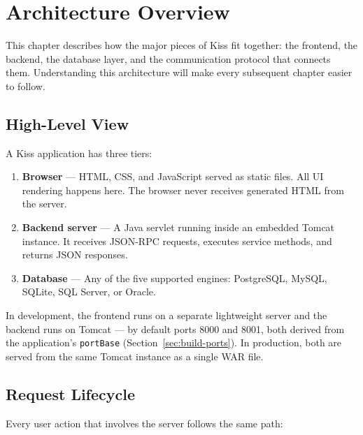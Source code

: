 \chapter{Architecture Overview}
\label{ch:architecture}

This chapter describes how the major pieces of Kiss fit together: the frontend, the backend, the database layer, and the communication protocol that connects them.  Understanding this architecture will make every subsequent chapter easier to follow.

\section{High-Level View}
\label{sec:arch-highlevel}

A Kiss application has three tiers:

\begin{enumerate}
  \item \textbf{Browser} --- HTML, CSS, and JavaScript served as static files.  All UI rendering happens here.  The browser never receives generated HTML from the server.
  \item \textbf{Backend server} --- A Java servlet running inside an embedded Tomcat instance.  It receives JSON-RPC requests, executes service methods, and returns JSON responses.
  \item \textbf{Database} --- Any of the five supported engines: PostgreSQL, MySQL, SQLite, SQL Server, or Oracle.
\end{enumerate}

\begin{notebox}
In development, the frontend runs on a separate lightweight server and the backend runs on Tomcat --- by default ports 8000 and 8001, both derived from the application's \texttt{portBase} (Section~\ref{sec:build-ports}).  In production, both are served from the same Tomcat instance as a single WAR file.
\end{notebox}

\section{Request Lifecycle}
\label{sec:arch-request}

Every user action that involves the server follows the same path:


